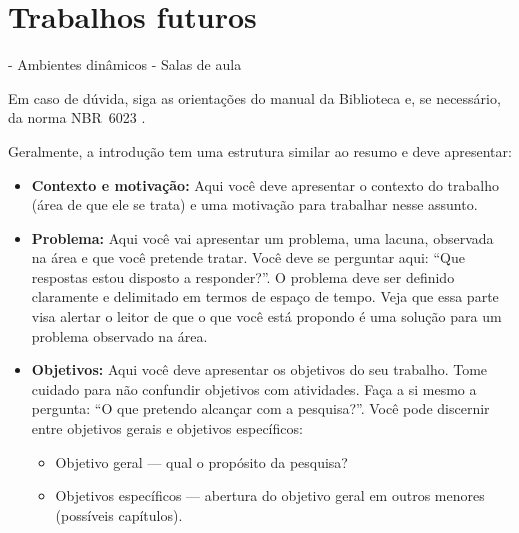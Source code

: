 \documentclass[english,brazilian]{UNISINOSmonografia}
\begin{document}
	\section{Trabalhos futuros}
- Ambientes dinâmicos
- Salas de aula

Em caso de dúvida, siga as orientações do manual da Biblioteca \cite{Biblioteca11} e, se necessário, da norma NBR~6023 \cite{NBR6023:2002}.


























































Geralmente, a introdução tem uma estrutura similar ao resumo e deve apresentar:
\begin{itemize}
	\item \textbf{Contexto e motivação:} Aqui você deve apresentar o contexto do trabalho (área de que ele se trata) e uma motivação para trabalhar nesse assunto.
	\item \textbf{Problema:} Aqui você vai apresentar um problema, uma lacuna, observada na área e que você pretende tratar. Você deve se perguntar aqui: ``Que respostas estou disposto a responder?''. O problema deve ser definido claramente e delimitado em termos de espaço de tempo. Veja que essa parte visa alertar o leitor de que o que você está propondo é uma solução para um problema observado na área. 
	

	\item \textbf{Objetivos:} Aqui você deve apresentar os objetivos do seu trabalho. Tome cuidado para não confundir objetivos com atividades.   Faça a si mesmo a pergunta: ``O que pretendo alcançar com a pesquisa?''. Você pode discernir entre objetivos gerais e objetivos específicos:
	\begin{itemize}
		\item Objetivo geral --- qual o propósito da pesquisa?
		\item Objetivos específicos --- abertura do objetivo geral em outros menores (possíveis capítulos).
	\end{itemize}
	
\end{itemize}


\end{document}
